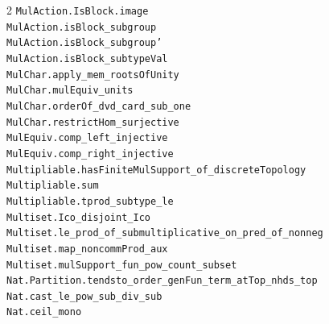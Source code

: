 \documentclass[10pt,a4paper]{article}
\begin{document}
\begin{multicols}{2}
\texttt{MulAction.\allowbreak{}IsBlock.\allowbreak{}image} \\
\texttt{MulAction.\allowbreak{}isBlock\_subgroup} \\
\texttt{MulAction.\allowbreak{}isBlock\_subgroup'} \\
\texttt{MulAction.\allowbreak{}isBlock\_subtypeVal} \\
\texttt{MulChar.\allowbreak{}apply\_mem\_rootsOfUnity} \\
\texttt{MulChar.\allowbreak{}mulEquiv\_units} \\
\texttt{MulChar.\allowbreak{}orderOf\_dvd\_card\_sub\_one} \\
\texttt{MulChar.\allowbreak{}restrictHom\_surjective} \\
\texttt{MulEquiv.\allowbreak{}comp\_left\_injective} \\
\texttt{MulEquiv.\allowbreak{}comp\_right\_injective} \\
\texttt{Multipliable.\allowbreak{}hasFiniteMulSupport\_of\_discreteTopology} \\
\texttt{Multipliable.\allowbreak{}sum} \\
\texttt{Multipliable.\allowbreak{}tprod\_subtype\_le} \\
\texttt{Multiset.\allowbreak{}Ico\_disjoint\_Ico} \\
\texttt{Multiset.\allowbreak{}le\_prod\_of\_submultiplicative\_on\_pred\_of\_nonneg} \\
\texttt{Multiset.\allowbreak{}map\_noncommProd\_aux} \\
\texttt{Multiset.\allowbreak{}mulSupport\_fun\_pow\_count\_subset} \\
\texttt{Nat.\allowbreak{}Partition.\allowbreak{}tendsto\_order\_genFun\_term\_atTop\_nhds\_top} \\
\texttt{Nat.\allowbreak{}cast\_le\_pow\_sub\_div\_sub} \\
\texttt{Nat.\allowbreak{}ceil\_mono} \\

\end{multicols}
\end{document}
